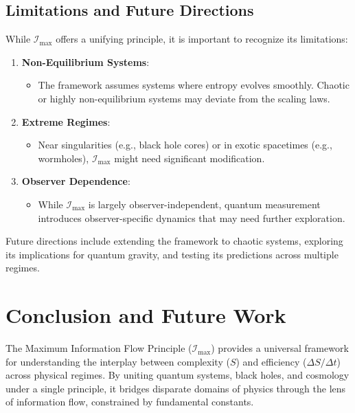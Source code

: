 \documentclass[12pt]{article}
\begin{document}
\subsection{Limitations and Future Directions}
While \( \mathcal{I}_{\text{max}} \) offers a unifying principle, it is important to recognize its limitations:
\begin{enumerate}
    \item \textbf{Non-Equilibrium Systems}:
    \begin{itemize}
        \item The framework assumes systems where entropy evolves smoothly. Chaotic or highly non-equilibrium systems may deviate from the scaling laws.
    \end{itemize}
    \item \textbf{Extreme Regimes}:
    \begin{itemize}
        \item Near singularities (e.g., black hole cores) or in exotic spacetimes (e.g., wormholes), \( \mathcal{I}_{\text{max}} \) might need significant modification.
    \end{itemize}
    \item \textbf{Observer Dependence}:
    \begin{itemize}
        \item While \( \mathcal{I}_{\text{max}} \) is largely observer-independent, quantum measurement introduces observer-specific dynamics that may need further exploration.
    \end{itemize}
\end{enumerate}

Future directions include extending the framework to chaotic systems, exploring its implications for quantum gravity, and testing its predictions across multiple regimes.


\section{Conclusion and Future Work}

The Maximum Information Flow Principle (\( \mathcal{I}_{\text{max}} \)) provides a universal framework for understanding the interplay between complexity (\( S \)) and efficiency (\( \Delta S / \Delta t \)) across physical regimes. By uniting quantum systems, black holes, and cosmology under a single principle, it bridges disparate domains of physics through the lens of information flow, constrained by fundamental constants.
\end{document}

